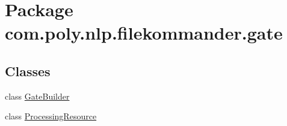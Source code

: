 \hypertarget{namespacecom_1_1poly_1_1nlp_1_1filekommander_1_1gate}{\section{Package com.\-poly.\-nlp.\-filekommander.\-gate}
\label{namespacecom_1_1poly_1_1nlp_1_1filekommander_1_1gate}
}
\subsection*{Classes}
\begin{DoxyCompactItemize}
\item 
class \hyperlink{classcom_1_1poly_1_1nlp_1_1filekommander_1_1gate_1_1_gate_builder}{Gate\-Builder}
\item 
class \hyperlink{classcom_1_1poly_1_1nlp_1_1filekommander_1_1gate_1_1_processing_resource}{Processing\-Resource}
\end{DoxyCompactItemize}
